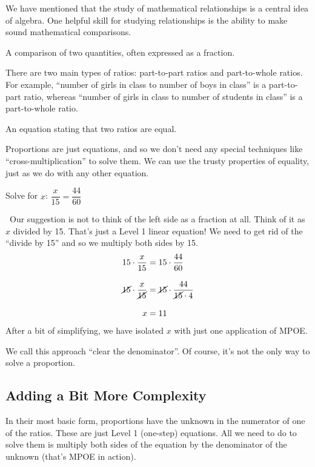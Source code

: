 We have mentioned that the study of mathematical relationships is a central idea of algebra. One helpful skill for studying relationships is the ability to make sound mathematical comparisons.

\begin{boxeddef}[Ratio]
A comparison of two quantities, often expressed as a fraction.
\end{boxeddef}

There are two main types of ratios: part-to-part ratios and part-to-whole ratios. For example, ``number of girls in class to number of boys in class'' is a part-to-part ratio, whereas ``number of girls in class to number of students in class'' is a part-to-whole ratio.

\begin{boxeddef}[Proportion]
An equation stating that two ratios are equal.
\end{boxeddef}

Proportions are just equations, and so we don't need any special techniques like ``cross-multiplication'' to solve them. We can use the trusty properties of equality, just as we do with any other equation.

\begin{boxedex}
Solve for $x$: $\dfrac{x}{15}=\dfrac{44}{60}$

\exsoln\ Our suggestion is not to think of the left side as a fraction at all. Think of it as $x$ divided by 15. That's just a Level 1 linear equation! We need to get rid of the ``divide by 15'' and so we multiply both sides by 15.
\[\begin{aligned}
15\cdot\frac{x}{15} &= 15\cdot\frac{44}{60}\\[2ex]
\cancel{15}\cdot\frac{x}{\cancel{15}} &= \cancel{15}\cdot\frac{44}{\cancel{15}\cdot4}\\[2ex]
x&=11
\end{aligned}\]
After a bit of simplifying, we have isolated $x$ with just one application of MPOE.
\end{boxedex}

We call this approach ``clear the denominator''. Of course, it's not the only way to solve a proportion.

\subsection{Adding a Bit More Complexity}

In their most basic form, proportions have the unknown in the numerator of one of the ratios. These are just Level 1 (one-step) equations. All we need to do to solve them is multiply both sides of the equation by the denominator of the unknown (that's MPOE in action).

